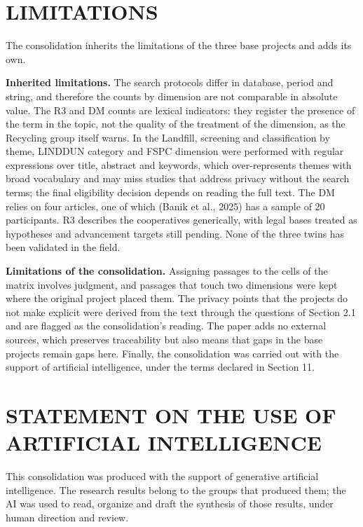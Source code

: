 \documentclass[12pt,a4paper,article,oneside,brazil,english]{abntex2}
\begin{document}
\section{LIMITATIONS}

The consolidation inherits the limitations of the three base projects and adds its own.

\textbf{Inherited limitations.} The search protocols differ in database, period and string, and therefore the counts by dimension are not comparable in absolute value. The R3 and DM counts are lexical indicators: they register the presence of the term in the topic, not the quality of the treatment of the dimension, as the Recycling group itself warns. In the Landfill, screening and classification by theme, LINDDUN category and FSPC dimension were performed with regular expressions over title, abstract and keywords, which over-represents themes with broad vocabulary and may miss studies that address privacy without the search terms; the final eligibility decision depends on reading the full text. The DM relies on four articles, one of which (Banik et al., 2025) has a sample of 20 participants. R3 describes the cooperatives generically, with legal bases treated as hypotheses and advancement targets still pending. None of the three twins has been validated in the field.

\textbf{Limitations of the consolidation.} Assigning passages to the cells of the matrix involves judgment, and passages that touch two dimensions were kept where the original project placed them. The privacy points that the projects do not make explicit were derived from the text through the questions of Section 2.1 and are flagged as the consolidation's reading. The paper adds no external sources, which preserves traceability but also means that gaps in the base projects remain gaps here. Finally, the consolidation was carried out with the support of artificial intelligence, under the terms declared in Section 11.

\section{STATEMENT ON THE USE OF ARTIFICIAL INTELLIGENCE}

This consolidation was produced with the support of generative artificial intelligence. The research results belong to the groups that produced them; the AI was used to read, organize and draft the synthesis of those results, under human direction and review.
\end{document}
